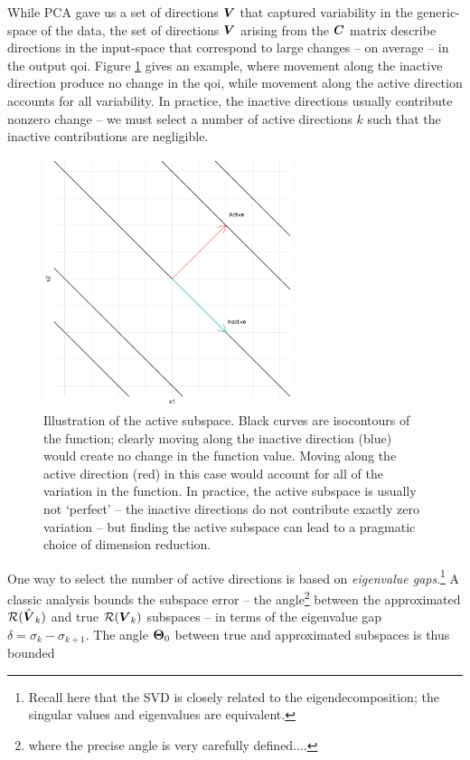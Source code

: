 \documentclass{article}
\begin{document}
While PCA gave us a set of directions $\boldsymbol{V}$ that captured variability in the
generic-space of the data, the set of directions $\boldsymbol{V}$ arising from the $\boldsymbol{C}$
matrix describe directions in the input-space that correspond to large changes
-- on average -- in the output qoi. Figure \ref{fig:as-contour} gives an
example, where movement along the inactive direction produce no change in the
qoi, while movement along the active direction accounts for all variability. In
practice, the inactive directions usually contribute nonzero change -- we must
select a number of active directions $k$ such that the inactive contributions
are negligible.

\begin{figure}[!ht]
  \centering
  \includegraphics[width=0.65\textwidth]{../../images/as_contour1}
  \caption{Illustration of the active subspace. Black curves are isocontours of
    the function; clearly moving along the inactive direction (blue) would
    create no change in the function value. Moving along the active direction
    (red) in this case would account for all of the variation in the function.
    In practice, the active subspace is usually not `perfect' -- the inactive
    directions do not contribute exactly zero variation -- but finding the
    active subspace can lead to a pragmatic choice of dimension reduction.}
  \label{fig:as-contour}
\end{figure}

One way to select the number of active directions is based on \emph{eigenvalue
  gaps}.\footnote{Recall here that the SVD is closely related to the
  eigendecomposition; the singular values and eigenvalues are equivalent.} A
classic analysis bounds the subspace error -- the angle\footnote{where the
  precise angle is very carefully defined....} between the approximated
$\mathcal{R}(\hat{\boldsymbol{V}}_k)$ and true $\mathcal{R}(\boldsymbol{V}_k)$ subspaces -- in terms of the eigenvalue
gap $\delta = \sigma_k - \sigma_{k+1}$.\cite{davis1970rotation} The angle
$\boldsymbol{\Theta}_0$ between true and approximated subspaces is thus bounded
\end{document}
